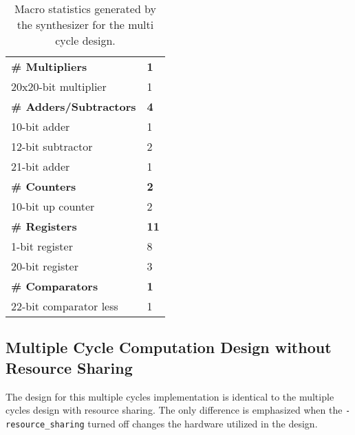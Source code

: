 \documentclass[paper=usletter, fontsize=12pt]{article}
\begin{document}
        \begin{table}[h]
            \caption{Macro statistics generated by the synthesizer for the
            multi cycle design.}
            \label{table:multimacro}
            \centering
            \begin{tabular*}{250pt}{ m{20em}m{1cm} }
                \textbf{\# Multipliers}         & \textbf{1} \\
                 20x20-bit multiplier           & 1 \\
                \textbf{\# Adders/Subtractors}  & \textbf{4} \\
                 10-bit adder                   & 1 \\
                 12-bit subtractor              & 2 \\
                 21-bit adder                   & 1 \\
                \textbf{\# Counters}            & \textbf{2} \\
                 10-bit up counter              & 2 \\
                \textbf{\# Registers}           & \textbf{11} \\
                 1-bit register                 & 8 \\
                 20-bit register                & 3 \\
                \textbf{\# Comparators}         & \textbf{1} \\
                 22-bit comparator less         & 1 \\
            \end{tabular*}

        \end{table}

        \subsection{Multiple Cycle Computation Design without Resource Sharing}
        The design for this multiple cycles implementation is identical to the
        multiple cycles design with resource sharing. The only difference is
        emphasized when the \texttt{-resource\_sharing} turned off changes the
        hardware utilized in the design.
\end{document}
